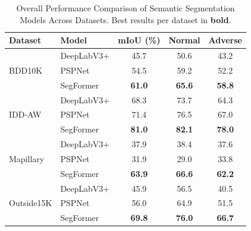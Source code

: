 


\begin{table}[t]
\centering
\caption{Overall Performance Comparison of Semantic Segmentation Models Across Datasets. Best results per dataset in \textbf{bold}.}
\label{tab:model_comparison}
\begin{tabular}{@{}llccc@{}}
\toprule
\textbf{Dataset} & \textbf{Model} & \textbf{mIoU (\%)} & \textbf{Normal} & \textbf{Adverse} \\
\midrule
\multirow{3}{*}{BDD10K} 
  & DeepLabV3+ & 45.7 & 50.6 & 43.2 \\
  & PSPNet     & 54.5 & 59.2 & 52.2 \\
  & SegFormer  & \textbf{61.0} & \textbf{65.6} & \textbf{58.8} \\
\midrule
\multirow{3}{*}{IDD-AW}
  & DeepLabV3+ & 68.3 & 73.7 & 64.3 \\
  & PSPNet     & 71.4 & 76.5 & 67.0 \\
  & SegFormer  & \textbf{81.0} & \textbf{82.1} & \textbf{78.0} \\
\midrule
\multirow{3}{*}{Mapillary}
  & DeepLabV3+ & 37.9 & 38.4 & 37.6 \\
  & PSPNet     & 31.9 & 29.0 & 33.8 \\
  & SegFormer  & \textbf{63.9} & \textbf{66.6} & \textbf{62.2} \\
\midrule
\multirow{3}{*}{Outside15K}
  & DeepLabV3+ & 45.9 & 56.5 & 40.5 \\
  & PSPNet     & 56.0 & 64.9 & 51.5 \\
  & SegFormer  & \textbf{69.8} & \textbf{76.0} & \textbf{66.7} \\
\bottomrule
\end{tabular}
\end{table}



